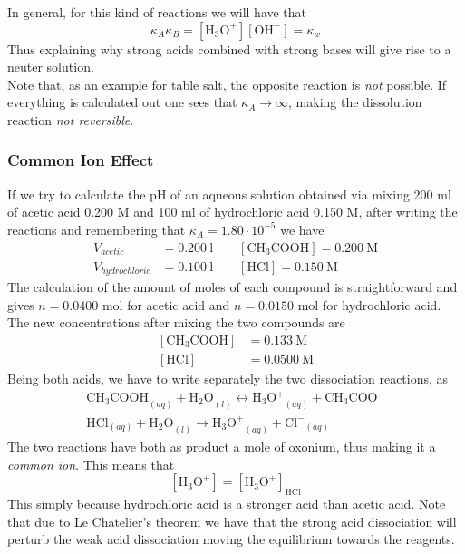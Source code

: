 \documentclass[../qm.tex]{subfiles}
\begin{document}
In general, for this kind of reactions we will have that 
\begin{equation}
	\kappa_A\kappa_B=\left[ \mathrm{H_3O^+} \right]\left[ \mathrm{OH^-} \right]=\kappa_w
	\label{eq:kappaabw.chem}
\end{equation}
Thus explaining why strong acids combined with strong bases will give rise to a neuter solution.\\
Note that, as an example for table salt, the opposite reaction is \textit{not} possible. If everything is calculated out one sees that $\kappa_A\to\infty$, making the dissolution reaction \textit{not reversible}.
\subsubsection{Common Ion Effect}
If we try to calculate the pH of an aqueous solution obtained via mixing 200 ml of acetic acid 0.200 M and 100 ml of hydrochloric acid 0.150 M, after writing the reactions and remembering that $\kappa_A=1.80\cdot10^{-5}$ we have
\begin{equation*}
	\begin{aligned}
		V_{acetic}&= 0.200\ \mathrm{l}\qquad\left[ \mathrm{CH_3COOH} \right]=0.200\ \mathrm{M}\\
		V_{hydrochloric}&= 0.100\ \mathrm{l}\qquad\left[ \mathrm{HCl} \right]=0.150\ \mathrm{M}
	\end{aligned}
\end{equation*}
The calculation of the amount of moles of each compound is straightforward and gives $n=0.0400$ mol for acetic acid and $n=0.0150$ mol for hydrochloric acid.\\
The new concentrations after mixing the two compounds are
\begin{equation*}
	\begin{aligned}
		\left[ \mathrm{CH_3COOH} \right]&= 0.133\ \mathrm{M}\\
		\left[ \mathrm{HCl} \right]&= 0.0500\ \mathrm{M}
	\end{aligned}
\end{equation*}
Being both acids, we have to write separately the two dissociation reactions, as
\begin{equation}
	\begin{aligned}
		\mathrm{CH_3COOH}_{(aq)}+\mathrm{H_2O}_{(l)}\longleftrightarrow\mathrm{H_3O^+}_{(aq)}+\mathrm{CH_3COO^-}\\
		\mathrm{HCl}_{(aq)}+\mathrm{H_2O}_{(l)}\to\mathrm{H_3O^+}_{(aq)}+\mathrm{Cl^-}_{(aq)}
	\end{aligned}
	\label{eq:ch3coohhcl.chem}
\end{equation}
The two reactions have both as product a mole of oxonium, thus making it a \emph{common ion}. This means that
\begin{equation}
	\left[ \mathrm{H_3O^+} \right]=\left[ \mathrm{H_3O^+} \right]_{\mathrm{HCl}}
	\label{eq:commonion.chem}
\end{equation}
This simply because hydrochloric acid is a stronger acid than acetic acid. Note that due to Le Chatelier's theorem we have that the strong acid dissociation will perturb the weak acid dissociation moving the equilibrium towards the reagents.
\end{document}
